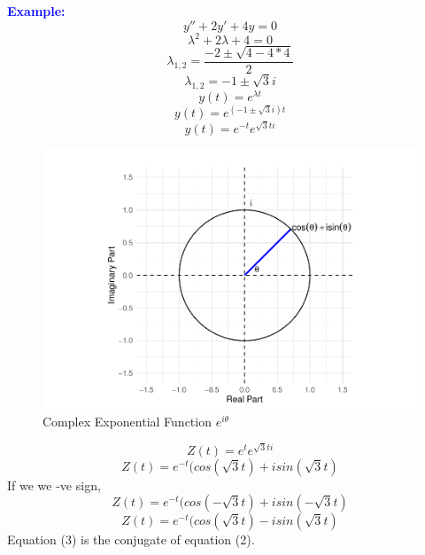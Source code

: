 \documentclass[
  11pt,
]{article}
\begin{document}
\textbf{\textcolor{blue}{Example:}} \[y''+2y'+4y=0\]
\[\lambda^2+2 \lambda + 4 = 0\]
\[\lambda_{1,2} = \frac{-2 \pm \sqrt{4-4*4}}{2}\]
\[\lambda_{1,2}=-1 \pm \sqrt{3}i\] \[y(t)=e^{\lambda t}\]
\[y(t)=e^{(-1 \pm \sqrt{3}i)t}\] \[y(t)=e^{-t}e^{\sqrt{3}ti} \tag{1}\]

\begin{figure}
\centering
\includegraphics{differential_files/figure-latex/difference5-1.pdf}
\caption{Complex Exponential Function \(e^{iθ}\)}
\end{figure}

\[Z(t)=e^{t}e^{\sqrt3ti}\] \[
Z(t)=e^{-t}(cos(\sqrt{3}t)+isin(\sqrt{3}t) \tag{2}
\] If we we -ve sign, \[
Z(t)=e^{-t}(cos(-\sqrt{3}t)+isin(-\sqrt{3}t)
\] \[Z(t)=e^{-t}(cos(\sqrt{3}t)-isin(\sqrt{3}t) \tag{3}\] Equation (3)
is the conjugate of equation (2).
\end{document}
